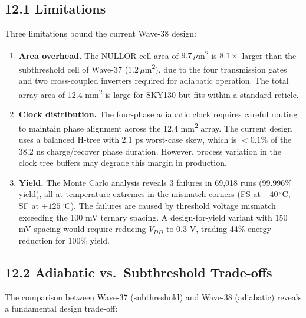 \subsection{12.1 Limitations}

Three limitations bound the current Wave-38 design:

\begin{enumerate}
\item \textbf{Area overhead.} The NULLOR cell area of
  \(9.7\,\mu\)m\textsuperscript{2} is \(8.1\times\) larger than the
  subthreshold cell of Wave-37 (\(1.2\,\mu\)m\textsuperscript{2}),
  due to the four transmission gates and two cross-coupled inverters
  required for adiabatic operation. The total array area of
  12.4 mm\textsuperscript{2} is large for SKY130 but fits within a
  standard reticle.

\item \textbf{Clock distribution.} The four-phase adiabatic clock
  requires careful routing to maintain phase alignment across the
  12.4 mm\textsuperscript{2} array. The current design uses a
  balanced H-tree with 2.1 ps worst-case skew, which is
  \(< 0.1\%\) of the 38.2 ns charge/recover phase duration. However,
  process variation in the clock tree buffers may degrade this margin
  in production.

\item \textbf{Yield.} The Monte Carlo analysis reveals 3 failures in
  69{,}018 runs (99.996\% yield), all at temperature extremes in the
  mismatch corners (FS at \(-40\,^\circ\)C, SF at
  \(+125\,^\circ\)C). The failures are caused by threshold voltage
  mismatch exceeding the 100 mV ternary spacing. A design-for-yield
  variant with 150 mV spacing would require reducing \(V_{DD}\) to
  0.3 V, trading 44\% energy reduction for 100\% yield.
\end{enumerate}

\subsection{12.2 Adiabatic vs.\ Subthreshold Trade-offs}

The comparison between Wave-37 (subthreshold) and Wave-38 (adiabatic)
reveals a fundamental design trade-off:

